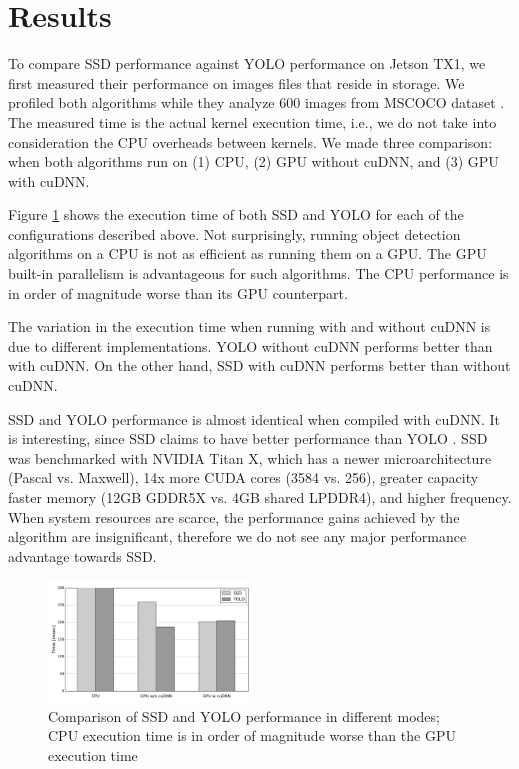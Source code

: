 \section{Results} 
\label{sec:results}

To compare SSD performance against YOLO performance on Jetson TX1, we first measured their performance on images files that reside in storage. We profiled both algorithms while they analyze 600 images from MSCOCO dataset \cite{mscoco}. The measured time is the actual kernel execution time, i.e., we do not take into consideration the CPU overheads between kernels. We made three comparison: when both algorithms run on (1) CPU, (2) GPU without cuDNN, and (3) GPU with cuDNN\footnotemark.


Figure \ref{fig:t_exec} shows the execution time of both SSD and YOLO for each of the configurations described above.
Not surprisingly, running object detection algorithms on a CPU is not as efficient as running them on a GPU. The GPU built-in parallelism is advantageous for such algorithms. The CPU performance is in order of magnitude worse than its GPU counterpart. 

The variation in the execution time when running with and without cuDNN is due to different implementations. YOLO without cuDNN performs better than with cuDNN. On the other hand, SSD with cuDNN performs better than without cuDNN.

SSD and YOLO performance is almost identical when compiled with cuDNN. It is interesting, since SSD claims to have better performance than YOLO \cite{liu2016ssd}. SSD was benchmarked with NVIDIA Titan X, which has a newer microarchitecture (Pascal vs. Maxwell), 14x more CUDA cores (3584 vs. 256), greater capacity faster memory (12GB GDDR5X vs. 4GB shared LPDDR4), and higher frequency. When system resources are scarce, the performance gains achieved by the algorithm are insignificant, therefore we do not see any major performance advantage towards SSD.

\begin{figure}[h]
	\includegraphics[width=0.48\textwidth]{./imgs/t_exec.pdf}
	\caption{Comparison of SSD and YOLO performance in different modes; CPU execution time is in order of magnitude worse than the GPU execution time}
	\label{fig:t_exec}
\end{figure}

